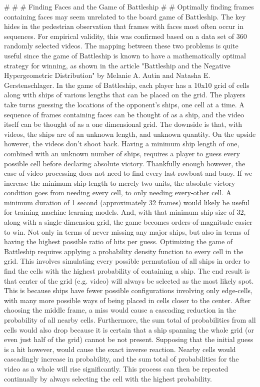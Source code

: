 \documentclass{article}
\newcommand{\br}{ \hfill \break}
\begin{document}
\date{June 21 2020} \br \begin{adjustwidth}{2.5em}{0pt}
\#\br
\#\br
\# Finding Faces and the Game of Battleship \br
\#\br
\#\br
\br
Optimally finding frames containing faces may seem unrelated to the board game of Battleship. The key hides in the pedestrian observation that frames with faces most often occur in sequences. For empirical validity, this was confirmed based on a data set of 360 randomly selected videos. The mapping between these two problems is quite useful since the game of Battleship is known to have a mathematically optimal strategy for winning, as shown in the article "Battleship and the Negative Hypergeometric Distribution" by Melanie A. Autin and Natasha E. Gerstenschlager. In the game of Battleship, each player has a 10x10 grid of cells along with ships of various lengths that can be placed on the grid. The players take turns guessing the locations of the opponent's ships, one cell at a time. A sequence of frames containing faces can be thought of as a ship, and the video itself can be thought of as a one dimensional grid. The downside is that, with videos, the ships are of an unknown length, and unknown quantity. On the upside however, the videos don't shoot back. Having a minimum ship length of one, combined with an unknown number of ships, requires a player to guess every possible cell before declaring absolute victory. Thankfully enough however, the case of video processing does not need to find every last rowboat and buoy. If we increase the minimum ship length to merely two units, the absolute victory condition goes from needing every cell, to only needing every-other cell. A minimum duration of 1 second (approximately 32 frames) would likely be useful for training machine learning models. And, with that minimum ship size of 32, along with a single-dimension grid, the game becomes orders-of-magnitude easier to win. Not only in terms of never missing any major ships, but also in terms of having the highest possible ratio of hits per guess.\br
\br
Optimizing the game of Battleship requires applying a probability density function to every cell in the grid. This involves simulating every possible permutation of all ships in order to find the cells with the highest probability of containing a ship. The end result is that center of the grid (e.g. video) will always be selected as the most likely spot. This is because ships have fewer possible configurations involving only edge-cells, with many more possible ways of being placed in cells closer to the center. After choosing the middle frame, a miss would cause a cascading reduction in the probability of all nearby cells. Furthermore, the sum total of probabilities from all cells would also drop because it is certain that a ship spanning the whole grid (or even just half of the grid) cannot be not present. Supposing that the initial guess is a hit however, would cause the exact inverse reaction. Nearby cells would cascadingly increase in probability, and the sum total of probabilities for the video as a whole will rise significantly. This process can then be repeated continually by always selecting the cell with the highest probability.\br

\end{adjustwidth}
\end{document}
